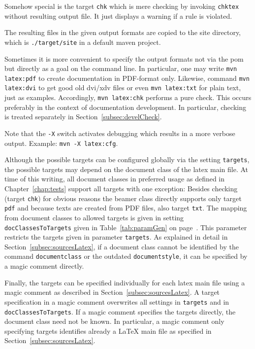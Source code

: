 Somehow special is the target \texttt{chk} 
which is mere checking by invoking \texttt{chktex} 
without resulting output file. 
It just displays a warning if a rule is violated. 

The resulting files in the given output formats 
are copied to the site directory, 
which is \texttt{./target/site} in a default maven project. 

Sometimes it is more convenient 
to specify the output formats not via the pom 
but directly as a goal on the command line. 
In particular, one may write \texttt{mvn latex:pdf} to create documentation 
in PDF-format only.
Likewise, command \texttt{mvn latex:dvi} to get good old dvi/xdv files
or even \texttt{mvn latex:txt} for plain text, just as examples. 
Accordingly, \texttt{mvn latex:chk} performs a pure check. 
This occurs preferably in the context of documentation development. 
In particular, checking is treated separately in Section~\ref{subsec:develCheck}. 

Note that the \texttt{-X} switch activates debugging 
which results in a more verbose output. 
Example: \texttt{mvn -X latex:cfg}. 

Although the possible targets can be configured globally 
via the setting \texttt{targets}, 
the possible targets may depend on the document class of the latex main file. 
At time of this writing, 
all document classes in preferred usage as defined in Chapter~\ref{chap:tests} 
support all targets with one exception: 
Besides checking (target \texttt{chk}) for obvious reasons 
the beamer class directly supports only target \texttt{pdf} 
and because texts are created from PDF files, also target \texttt{txt}. 
The mapping from document classes to allowed targets 
is given in setting \texttt{docClassesToTargets} given in 
Table~\ref{tab:paramGen} on page~\pageref{tab:paramGen}. 
This parameter restricts the targets given in parameter \texttt{targets}. 
As explained in detail in  Section~\ref{subsec:sourcesLatex}, 
if a document class cannot be identified by the command \texttt{documentclass} 
or the outdated \texttt{documentstyle}, 
it can be specified by a magic comment directly. 

Finally, the targets can be specified individually for each latex main file 
using a magic comment as described in Section~\ref{subsec:sourcesLatex}. 
A target specification in a magic comment overwrites all settings in 
\texttt{targets} and in \texttt{docClassesToTargets}. 
If a magic comment specifies the targets directly, 
the document class need not be known. 
In particular, a magic comment only specifying targets identifies already a \LaTeX{} main file 
as specified in Section~\ref{subsec:sourcesLatex}. 


